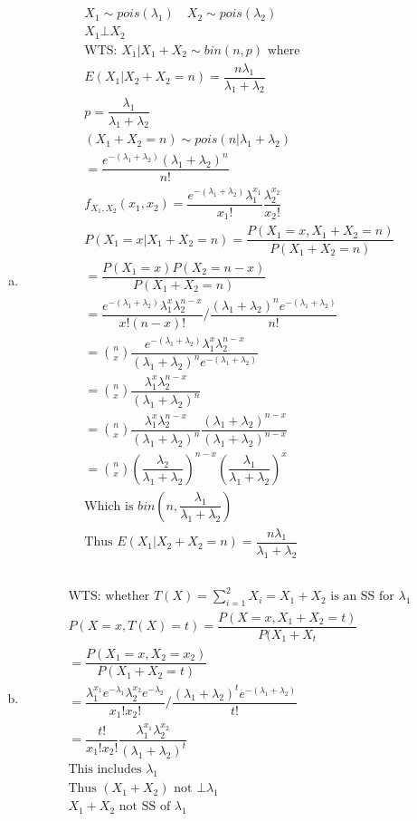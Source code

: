 \documentclass{article}
\newcommand{\lm}{\lambda}
\begin{document}
\begin{flushleft}
\begin{enumerate}[(a)]
	\item 
\begin{multline*}\\
X_1\sim pois(\lambda_1) \quad X_2\sim pois(\lambda_2)\\
X_1 \bot X_2\\
\text{WTS: } X_1|X_1+X_2 \sim bin(n,p) \text{ where}\\
E(X_1|X_2+X_2=n)=\dfrac{n\lambda_1}{\lambda_1+\lambda_2}\\
p=\dfrac{\lambda_1}{\lambda_1+\lambda_2}\\
(X_1+X_2=n) \sim pois(n|\lm_1+\lm_2)\\
= \dfrac{e^{-(\lm_1+\lm_2)}(\lm_1+\lm_2)^n}{n!}\\
f_{X_1,X_2}(x_1,x_2)=\dfrac{e^{-(\lm_1+\lm_2)}\lm_1^{x_1}}{x_1!}\dfrac{\lm_2^{x_2}}{x_2!}\\
P(X_1=x|X_1+X_2=n)=\dfrac{P(X_1=x,X_1+X_2=n)}{P(X_1+X_2=n)}\\
=\dfrac{P(X_1=x)P(X_2=n-x)}{P(X_1+X_2=n)}\\
=\dfrac{e^{-(\lm_1+\lm_2)}\lm_1^x\lm_2^{n-x}}{x!(n-x)!}/\dfrac{(\lambda_1+\lm_2)^n e^{-(\lm_1+\lm_2)}}{n!}\\
={n\choose x}\dfrac{e^{-(\lm_1+\lm_2)}\lm_1^x\lm_2^{n-x}}{(\lambda_1+\lm_2)^n e^{-(\lm_1+\lm_2)}}\\
={n\choose x}\dfrac{\lm_1^x\lm_2^{n-x}}{(\lambda_1+\lm_2)^n}\\
={n\choose x}\dfrac{\lm_1^x\lm_2^{n-x}}{(\lambda_1+\lm_2)^n}\dfrac{(\lambda_1+\lm_2)^{n-x}}{(\lambda_1+\lm_2)^{n-x}}\\
={n\choose x}\left(\dfrac{\lm_2}{\lm_1+\lm_2}\right)^{n-x}\left(\dfrac{\lm_1}{\lm_1+\lm_2}\right)^x\\
\text{Which is } bin(n,\dfrac{\lambda_1}{\lm_1+\lm_2})\\
\text{Thus } E(X_1|X_2+X_2=n)=\dfrac{n\lambda_1}{\lambda_1+\lambda_2}\\
\end{multline*} 

	\item                         
\begin{multline*}\\ 
\text{WTS: whether } T(X)=\sum_{i=1}^{2}X_i=X_1+X_2 \text{ is an SS for }\lm_1\\ 
P(X=x,T(X)=t)=\dfrac{P(X=x,X_1+X_2=t)}{P(X_1+X_t}\\
=\dfrac{P(X_1=x,X_2=x_2)}{P(X_1+X_2=t)}\\
=\dfrac{\lm_1^{x_1}e^{-\lm_1}\lm_2^{x_2}e^{-\lm_2}}{x_1!x_2!}/\dfrac{(\lm_1+\lm_2)^t e^{-(\lm_1+\lm_2)}}{t!}\\
=\dfrac{t!}{x_1!x_2!}\dfrac{\lm_1^{x_1}\lm_2^{x_2}}{(\lm_1+\lm_2)^t}\\
\text{This includes } \lm_1\\
\text{Thus } (X_1+X_2) \text{ not } \bot \lm_1\\
X_1+X_2 \text{ not SS of } \lm_1\\
\end{multline*}                


\end{enumerate}
\end{flushleft}
\end{document}
